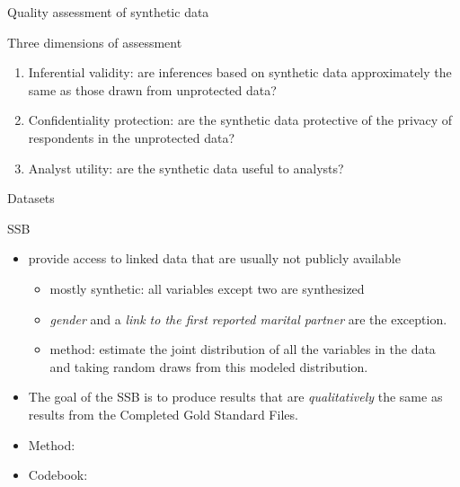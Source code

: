 \begin{frame}{Quality assessment of synthetic data}
	\begin{block}{Three dimensions of assessment}
		\begin{enumerate}
			\item Inferential validity: are inferences based on synthetic data approximately the same as those drawn from unprotected data?
			\item Confidentiality protection: are the synthetic data protective of the privacy of respondents in the unprotected data?
			\item Analyst utility: are the synthetic data useful to analysts?
		\end{enumerate}
	\end{block}
\end{frame}



\begin{frame}{Datasets}
	\begin{block}{\acf{SSB}}
		\begin{itemize}
			\item 	provide access to linked data that are usually not publicly available
			\begin{itemize}
			\item  mostly synthetic: all variables except two are synthesized
			\item  \textit{gender} and a \textit{link to the first reported marital partner} are the exception. 
			\item  method: estimate the joint distribution of all the variables in the data and taking random draws from this modeled distribution. %
   		    \end{itemize}
			\item The goal of the SSB is to produce results that are \textit{qualitatively} the same as results from the Completed Gold Standard Files. 
			\item Method: \cite{CreationSSBv7}
			\item Codebook: \cite{CED2AR-SSBv70}
			
		\end{itemize}
	\end{block}
\end{frame}

